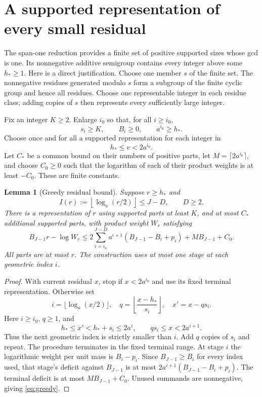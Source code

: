 \documentclass[11pt]{article}
\newtheorem{lemma}[theorem]{Lemma}
\theoremstyle{remark}\newtheorem{remark}[theorem]{Remark}
\begin{document}
\section{A supported representation of every small residual}
The span-one reduction provides a finite set of positive supported sizes
whose gcd is one. Its nonnegative additive semigroup contains every integer
above some $h_*\ge1$. Here is a direct justification. Choose one member
$s$ of the finite set. The nonnegative residues generated modulo $s$ form
a subgroup of the finite cyclic group and hence all residues. Choose one
representable integer in each residue class; adding copies of $s$ then
represents every sufficiently large integer.

Fix an integer $K\ge2$. Enlarge $i_0$ so that, for all $i\ge i_0$,
\begin{equation}\label{eq:start}
 s_i\ge K,\qquad B_i\ge0,\qquad a^{i_0}\ge h_*.
\end{equation}
Choose once and for all a supported representation for each integer in
\[
 h_*\le v<2a^{i_0}.
\]
Let $C_*$ be a common bound on their numbers of positive parts, let
$M=\lceil2a^{i_0}\rceil$, and choose $C_0\ge0$ such that the logarithm of
each of their product weights is at least $-C_0$. These are finite constants.

\begin{lemma}[Greedy residual bound]\label{lem:greedy}
Suppose $r\ge h_*$ and
\[
 I(r):=\left\lfloor\log_a(r/2)\right\rfloor\le J-D,
 \qquad D\ge2.
\]
There is a representation of $r$ using supported parts at least $K$, and
at most $C_*$ additional supported parts, with product weight $W_r$ satisfying
\begin{equation}\label{eq:greedy}
 B_{J-1}r-\log W_r
 \le 2\sum_{i=i_0}^{J-D}a^{i+1}
       (B_{J-1}-B_i+p_i)+MB_{J-1}+C_0.
\end{equation}
All parts are at most $r$. The construction uses at most one stage at each
geometric index $i$.
\end{lemma}

\begin{proof}
With current residual $x$, stop if $x<2a^{i_0}$ and use its fixed terminal
representation. Otherwise set
\[
 i=\lfloor\log_a(x/2)\rfloor,\quad
 q=\left\lfloor\frac{x-h_*}{s_i}\right\rfloor,\quad
 x'=x-qs_i.
\]
Here $i\ge i_0$, $q\ge1$, and
\[
 h_*\le x'<h_*+s_i\le2a^i,\qquad qs_i\le x<2a^{i+1}.
\]
Thus the next geometric index is strictly smaller than $i$. Add $q$ copies
of $s_i$ and repeat. The procedure terminates in the fixed terminal range.
At stage $i$ the logarithmic weight per unit mass is $B_i-p_i$.
Since $B_{J-1}\ge B_i$ for every index used, that stage's deficit against
$B_{J-1}$ is at most
$2a^{i+1}(B_{J-1}-B_i+p_i)$. The terminal deficit is at most
$MB_{J-1}+C_0$. Unused summands are nonnegative, giving \eqref{eq:greedy}.
\end{proof}
\end{document}
